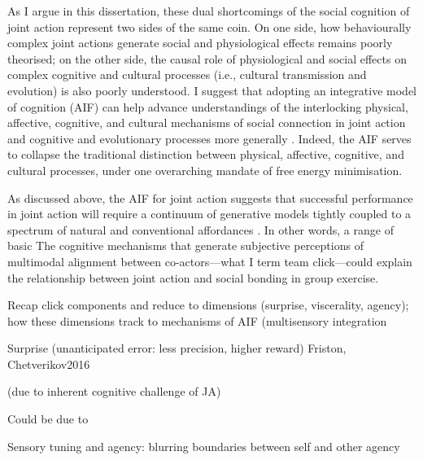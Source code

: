 \begin{CJK}{UTF8}{gbsn}
As I argue in this dissertation, these dual shortcomings of the social cognition of joint action represent two sides of the same coin. On one side, how behaviourally complex joint actions generate social and physiological effects remains poorly theorised; on the other side, the causal role of physiological and social effects on complex cognitive and cultural processes (i.e., cultural transmission and evolution) is also poorly understood.  I suggest that adopting an integrative model of cognition (AIF) can help advance understandings of the interlocking physical, affective, cognitive, and cultural mechanisms of social connection in joint action and cognitive and evolutionary processes more generally \citep{Ramstead2018}. Indeed, the AIF serves to collapse the traditional distinction between physical, affective, cognitive, and cultural processes, under one overarching mandate of free energy minimisation.


As discussed above, the AIF for joint action suggests that successful performance in joint action will require a continuum of generative models tightly coupled to a spectrum of natural and conventional affordances \citep{Clark2015}.  In other words, a range of basic  The cognitive mechanisms that generate subjective perceptions of multimodal alignment between co-actors---what I term team click---could explain the relationship between joint action and social bonding in group exercise.

Recap click components and reduce to dimensions (surprise, viscerality, agency); how these dimensions track to mechanisms of AIF (multisensory integration





Surprise (unanticipated error: less precision, higher reward)
Friston,
Chetverikov2016


(due to inherent cognitive challenge of JA)

Could be due to


Sensory tuning and agency: blurring boundaries between self and other agency










\end{CJK}
